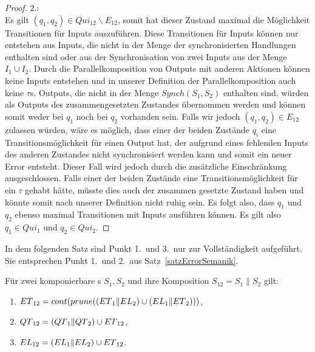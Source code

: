 \begin{proof}
  2.:\\
  Es gilt $(q_1,q_2)\in Qui_{12}\backslash E_{12}$, somit hat
  dieser Zustand maximal die Möglichkeit Transitionen für Inputs auszuführen.
  Diese Transitionen für Inputs können nur entstehen aus Inputs, die nicht
  in der Menge der synchronisierten Handlungen enthalten sind oder aus der
  Synchronisation von zwei Inputs aus der Menge $I_1\cup I_2$. Durch die
  Parallelkomposition von Outputs mit anderen Aktionen können keine Inputs
  entstehen und in unserer Definition der Parallelkomposition auch keine
  $\tau$s. Outputs, die nicht in der Menge $Synch(S_1,S_2)$ enthalten sind,
  würden als Outputs des zusammengesetzten Zustandes übernommen werden und
  können somit weder bei $q_1$ noch bei $q_2$ vorhanden sein. Falls wir jedoch
  $(q_1,q_2)\in E_{12}$ zulassen würden, wäre es möglich, dass einer der beiden
  Zustände $q_i$ eine Transitionsmöglichkeit für einen Output hat, der aufgrund
  eines fehlenden Inputs des anderen Zustandes nicht synchronisiert werden kann
  und somit ein neuer Error entsteht. Dieser Fall wird jedoch durch die
  zusätzliche Einschränkung ausgeschlossen. Falls einer der beiden Zustände
  eine Transitionsmöglichkeit für ein $\tau$ gehabt hätte, müsste dies auch der
  zusammen gesetzte Zustand haben und könnte somit nach unserer Definition
  nicht ruhig sein. Es folgt also, dass $q_1$ und $q_2$ ebenso maximal
  Transitionen mit Inputs ausführen können. Es gilt also $q_1\in Qui_1$ und
  $q_2\in Qui_2$.
\end{proof}

In dem folgenden Satz sind Punkt 1.\ und 3.\ nur zur Vollständigkeit aufgeführt.
Sie entsprechen Punkt 1.\ und 2.\ aus Satz~\ref{satzErrorSemanik}.

\begin{satz}
  \label{satzQuiSemantik}
  Für zwei komponierbare \EIO{}s $S_1, S_2$ und ihre Komposition $S_{12} =
  S_1\|S_2$ gilt:
  \begin{enumerate}
    \item $ET{}_{12} = cont{}(prune{}((ET{}_1\|EL{}_2)\cup (EL{}_1\|ET{}_2)))$,
    \item $QT{}_{12} = (QT{}_1\|QT{}_2)\cup ET{}_{12}$,
    \item $EL{}_{12} = (EL{}_1\|EL{}_2)\cup ET{}_{12}$.
  \end{enumerate}
\end{satz}


